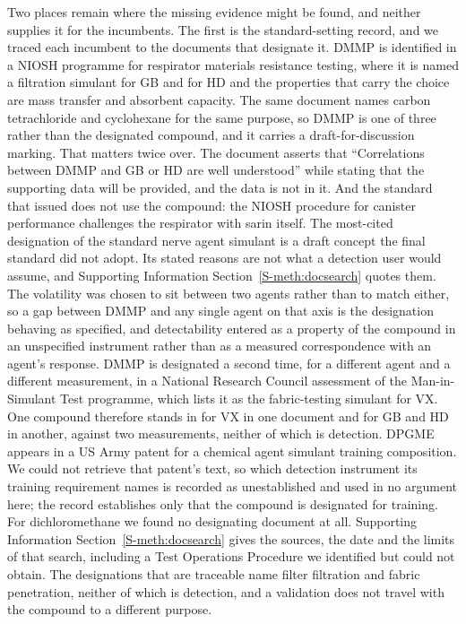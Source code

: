 \documentclass[journal=jacsat,manuscript=article,margin=1in]{achemso}
\begin{document}
Two places remain where the missing evidence might be found, and neither
supplies it for the incumbents. The first is the standard-setting record,
and we traced each incumbent to the documents that designate it. DMMP is
identified in a NIOSH programme for
respirator materials resistance testing, where it is named a filtration
simulant for GB and for HD and the properties that carry the choice are mass
transfer and absorbent capacity.\cite{niosh2002simulant} The same document
names carbon tetrachloride and cyclohexane for the same purpose, so DMMP is
one of three rather than the designated compound, and it carries a
draft-for-discussion marking.
That matters twice over. The document asserts that
``Correlations between DMMP and GB or HD are well understood'' while stating
that the supporting data will be provided, and the data is not in it. And the
standard that issued does not use the compound: the NIOSH procedure for
canister performance challenges the respirator with sarin
itself.\cite{nioshaprstp0350} The most-cited designation of the standard nerve
agent simulant is a draft concept the final standard did not adopt. Its stated
reasons are not what a detection user would assume, and Supporting Information
Section~\ref{S-meth:docsearch} quotes them. The
volatility was chosen to sit between two agents rather than to match either, so
a gap between DMMP and any single agent on that axis is the designation
behaving as specified, and detectability entered as a property of the compound
in an unspecified instrument rather than as a measured correspondence with an
agent's response. DMMP is designated a second time, for a different agent and
a different measurement, in a National Research Council assessment of the
Man-in-Simulant Test programme, which lists it as the fabric-testing simulant
for VX.\cite{nrc1997mist} One compound therefore stands in for VX in one
document and for GB and HD in another, against two measurements, neither of
which is detection.
DPGME appears in a US Army patent for a chemical agent simulant training
composition.\cite{seitzinger2006simulant} We could not retrieve that patent's
text, so which detection instrument its training requirement names is recorded
as unestablished and used in no argument here; the record establishes only that
the compound is designated for training. For dichloromethane we found no
designating document at all. Supporting Information
Section~\ref{S-meth:docsearch} gives the sources, the date and the limits of
that search, including a Test Operations Procedure we identified but could not
obtain. The designations that are traceable name filter filtration and fabric
penetration, neither of which is detection, and a validation does not travel
with the compound to a different purpose.
\end{document}
